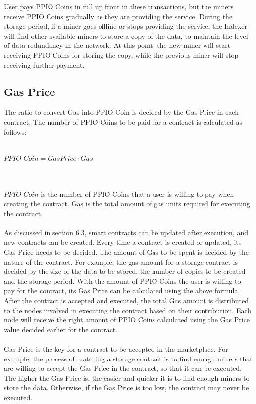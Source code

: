 \documentclass[10pt,a4paper]{article}
\begin{document}
\noindent   
User pays PPIO Coins in full up front in these transactions, but the miners receive PPIO Coins gradually as they are providing the service. During the storage period, if a miner goes offline or stops providing the service, the Indexer will find other available miners to store a copy of the data, to maintain the level of data redundancy in the network. At this point, the new miner will start receiving PPIO Coins for storing the copy, while the previous miner will stop receiving further payment.


      \subsection{Gas Price}  %
The ratio to convert Gas into PPIO Coin is decided by the Gas Price in each contract. The number of PPIO Coins to be paid for a contract is calculated as follows:
 \vspace{-0.5em}
\\ \\ \centerline{$PPIO$ $Coin$$ = GasPrice \cdot Gas$}
 \vspace{-1.5em}
\\ \\$PPIO$ $Coin$ is the number of PPIO Coins that a user is willing to pay when creating the contract. Gas is the total amount of gas units required for executing the contract.
 \vspace{-0.5em}
\\ \\ As discussed in section 6.3, smart contracts can be updated after execution, and new contracts can be created. Every time a contract is created or updated, its Gas Price needs to be decided. The amount of Gas to be spent is decided by the nature of the contract. For example, the gas amount for a storage contract is decided by the size of the data to be stored, the number of copies to be created and the storage period. With the amount of PPIO Coins the user is willing to pay for the contract, its Gas Price can be calculated using the above formula. After the contract is accepted and executed, the total Gas amount is distributed to the nodes involved in executing the contract based on their contribution. Each node will receive the right amount of PPIO Coins calculated using the Gas Price value decided earlier for the contract.
 \vspace{-0.5em}
\\ \\Gas Price is the key for a contract to be accepted in the marketplace. For example, the process of matching a storage contract is to find enough miners that are willing to accept the Gas Price in the contract, so that it can be executed. The higher the Gas Price is, the easier and quicker it is to find enough miners to store the data. Otherwise, if the Gas Price is too low, the contract may never be executed.  
\end{document}
